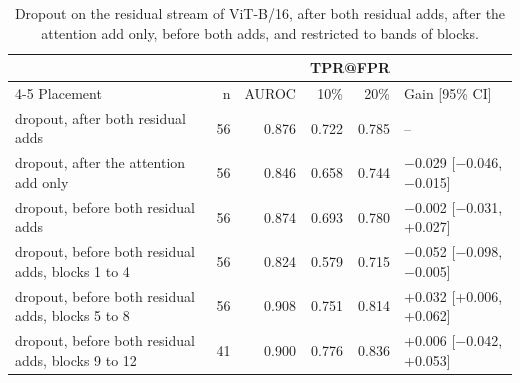 \begin{table}[htbp]
\centering
\small
\caption{Dropout on the residual stream of ViT-B/16, after both residual adds, after the attention add only, before both adds, and restricted to bands of blocks.}
\label{tab:staircase-residual}
\begin{tabular}{lrrrrl}
\toprule
 & & & \multicolumn{2}{c}{TPR@FPR} & \\
\cmidrule(lr){4-5}
Placement & n & AUROC & 10\% & 20\% & Gain [95\% CI] \\
\midrule
dropout, after both residual adds & 56 & 0.876 & 0.722 & 0.785 & -- \\
dropout, after the attention add only & 56 & 0.846 & 0.658 & 0.744 & $-$0.029 [$-$0.046, $-$0.015] \\
dropout, before both residual adds & 56 & 0.874 & 0.693 & 0.780 & $-$0.002 [$-$0.031, +0.027] \\
dropout, before both residual adds, blocks 1 to 4 & 56 & 0.824 & 0.579 & 0.715 & $-$0.052 [$-$0.098, $-$0.005] \\
dropout, before both residual adds, blocks 5 to 8 & 56 & 0.908 & 0.751 & 0.814 & +0.032 [+0.006, +0.062] \\
dropout, before both residual adds, blocks 9 to 12 & 41 & 0.900 & 0.776 & 0.836 & +0.006 [$-$0.042, +0.053] \\
\bottomrule
\end{tabular}
\end{table}
